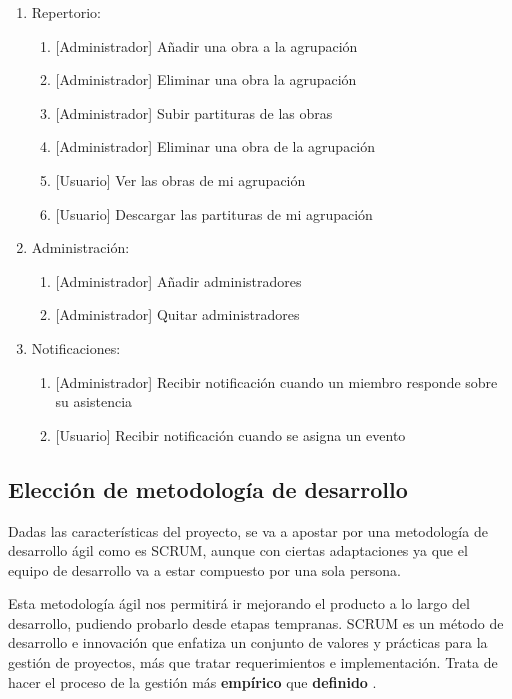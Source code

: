 \begin{enumerate}
\begin{enumerate}
    \end{enumerate}
    \item Repertorio:
    \begin{enumerate}
        \item {[Administrador]} Añadir una obra a la agrupación
        \item {[Administrador]} Eliminar una obra la agrupación
        \item {[Administrador]} Subir partituras de las obras
        \item {[Administrador]} Eliminar una obra de la agrupación
        \item {[Usuario]} Ver las obras de mi agrupación
        \item {[Usuario]} Descargar las partituras de mi agrupación
    \end{enumerate}
    \item Administración:
    \begin{enumerate}
        \item {[Administrador]} Añadir administradores
        \item {[Administrador]} Quitar administradores
    \end{enumerate}
    \item Notificaciones:
    \begin{enumerate}
        \item {[Administrador]} Recibir notificación cuando un miembro responde sobre su asistencia
        \item {[Usuario]} Recibir notificación cuando se asigna un evento
    \end{enumerate}
\end{enumerate}


\subsection{Elección de metodología de desarrollo}

Dadas las características del proyecto, se va a apostar por una metodología de desarrollo ágil como es SCRUM, aunque con ciertas adaptaciones ya que el equipo de desarrollo va a estar compuesto por una sola persona.

Esta metodología ágil nos permitirá ir mejorando el producto a lo largo del desarrollo, pudiendo probarlo desde etapas tempranas. SCRUM es un método de desarrollo e innovación que enfatiza un conjunto de valores y prácticas para la gestión de proyectos, más que tratar requerimientos e implementación. Trata de hacer el proceso de la gestión más \textbf{empírico} que \textbf{definido} \cite{scrum}.

